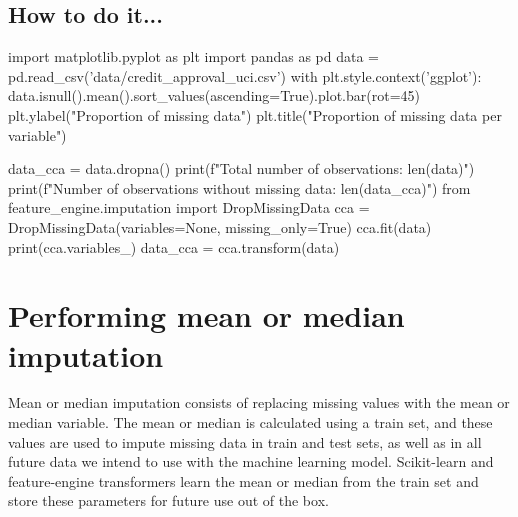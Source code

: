 \subsection{How to do it...}
\begin{pyc}
import matplotlib.pyplot as plt
import pandas as pd
data = pd.read_csv('data/credit_approval_uci.csv')
with plt.style.context('ggplot'):
    data.isnull().mean().sort_values(ascending=True).plot.bar(rot=45)
    plt.ylabel("Proportion of missing data")
    plt.title("Proportion of missing data per variable")
\end{pyc}
\begin{pyc}
data_cca = data.dropna()
print(f"Total number of observations: {len(data)}")
print(f"Number of observations without missing data: {len(data_cca)}")
from feature_engine.imputation import DropMissingData
cca = DropMissingData(variables=None, missing_only=True)
cca.fit(data)
print(cca.variables_)
data_cca = cca.transform(data)
\end{pyc}



\section{Performing mean or median imputation}
Mean or median imputation consists of replacing missing values with the mean or median variable.
The mean or median is calculated using a train set, and these values are used to impute missing data
in train and test sets, as well as in all future data we intend to use with the machine learning model.
Scikit-learn and feature-engine transformers learn the mean or median from the train set and
store these parameters for future use out of the box.


